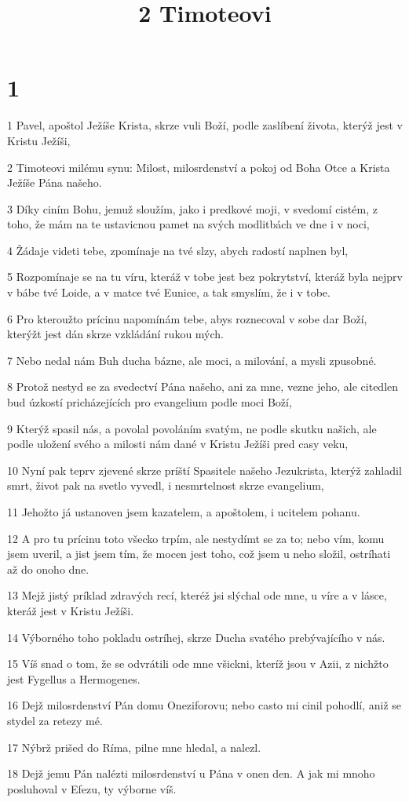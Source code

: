 

\title{2 Timoteovi}

\chapter{1}

\par 1 Pavel, apoštol Ježíše Krista, skrze vuli Boží, podle zaslíbení života, kterýž jest v Kristu Ježíši,
\par 2 Timoteovi milému synu: Milost, milosrdenství a pokoj od Boha Otce a Krista Ježíše Pána našeho.
\par 3 Díky ciním Bohu, jemuž sloužím, jako i predkové moji, v svedomí cistém, z toho, že mám na te ustavicnou pamet na svých modlitbách ve dne i v noci,
\par 4 Žádaje videti tebe, zpomínaje na tvé slzy, abych radostí naplnen byl,
\par 5 Rozpomínaje se na tu víru, kteráž v tobe jest bez pokrytství, kteráž byla nejprv v bábe tvé Loide, a v matce tvé Eunice, a tak smyslím, že i v tobe.
\par 6 Pro kteroužto prícinu napomínám tebe, abys roznecoval v sobe dar Boží, kterýžt jest dán skrze vzkládání rukou mých.
\par 7 Nebo nedal nám Buh ducha bázne, ale moci, a milování, a mysli zpusobné.
\par 8 Protož nestyd se za svedectví Pána našeho, ani za mne, vezne jeho, ale citedlen bud úzkostí pricházejících pro evangelium podle moci Boží,
\par 9 Kterýž spasil nás, a povolal povoláním svatým, ne podle skutku našich, ale podle uložení svého a milosti nám dané v Kristu Ježíši pred casy veku,
\par 10 Nyní pak teprv zjevené skrze príští Spasitele našeho Jezukrista, kterýž zahladil smrt, život pak na svetlo vyvedl, i nesmrtelnost skrze evangelium,
\par 11 Jehožto já ustanoven jsem kazatelem, a apoštolem, i ucitelem pohanu.
\par 12 A pro tu prícinu toto všecko trpím, ale nestydímt se za to; nebo vím, komu jsem uveril, a jist jsem tím, že mocen jest toho, což jsem u neho složil, ostríhati až do onoho dne.
\par 13 Mejž jistý príklad zdravých recí, kteréž jsi slýchal ode mne, u víre a v lásce, kteráž jest v Kristu Ježíši.
\par 14 Výborného toho pokladu ostríhej, skrze Ducha svatého prebývajícího v nás.
\par 15 Víš snad o tom, že se odvrátili ode mne všickni, kteríž jsou v Azii, z nichžto jest Fygellus a Hermogenes.
\par 16 Dejž milosrdenství Pán domu Oneziforovu; nebo casto mi cinil pohodlí, aniž se stydel za retezy mé.
\par 17 Nýbrž prišed do Ríma, pilne mne hledal, a nalezl.
\par 18 Dejž jemu Pán nalézti milosrdenství u Pána v onen den. A jak mi mnoho posluhoval v Efezu, ty výborne víš.

